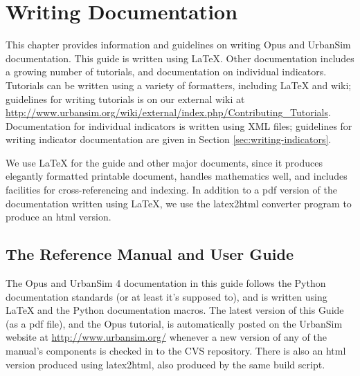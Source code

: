

\chapter{Writing Documentation}

This chapter provides information and guidelines on writing Opus and
UrbanSim documentation.  This guide is written using \LaTeX{}. \latexindex
Other documentation includes a growing number of tutorials, and documentation on individual
indicators.  Tutorials can be written using a variety of formatters, 
including \LaTeX{} and wiki;
guidelines for writing tutorials is on our external wiki at
\url{http://www.urbansim.org/wiki/external/index.php/Contributing_Tutorials}.
Documentation for individual indicators is written using XML files;
guidelines for writing indicator documentation are given in Section
\ref{sec:writing-indicators}.

We use \LaTeX{} for the guide and other major documents,
since it produces elegantly formatted printable document, handles
mathematics well, and includes facilities for cross-referencing and
indexing.  In addition to a pdf version of the documentation written using
\LaTeX{}, \latexindex we use the latex2html \latexindex 
converter program to produce an html version.

\section{The Reference Manual and User Guide}

The Opus and UrbanSim 4 documentation in this guide follows the Python \pythonindex
documentation standards (or at least it's supposed to), and is written
using \LaTeX{} \latexindex and the Python \pythonindex documentation macros.
The latest version of this Guide (as a pdf file), and the Opus tutorial, is
automatically posted on the UrbanSim website at
\url{http://www.urbansim.org/} whenever a new version of any of the
manual's components is checked in to the CVS \cvsindex repository.  There is also an
html version produced using latex2html, \latexindex also produced by the same build
script.

